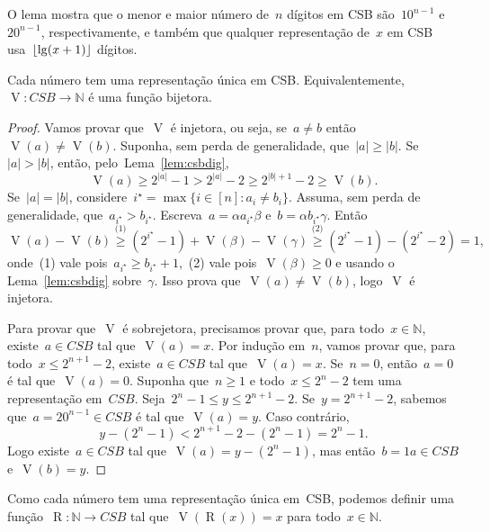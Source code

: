 \documentclass[main.tex]{subfiles}
\newcommand{\CSB}{\textit{CSB}}
\renewcommand{\V}{\operatorname{V}}
\newcommand{\R}{\operatorname{R}}
\begin{document}
O lema mostra que o menor e maior número de~$n$ dígitos em CSB são~$10^{n-1}$ e~$20^{n-1}$, respectivamente, e também que qualquer representação de~$x$ em CSB usa~$\lfloor\lg(x + 1)\rfloor$ dígitos.

\begin{theorem} \label{thm:csbbij}
	Cada número tem uma representação única em CSB. Equivalentemente,~${\V: \CSB \rightarrow \mathbb{N}}$ é uma função bijetora.
\end{theorem}
\begin{proof}
	Vamos provar que~$\V$ é injetora, ou seja, se~${a \neq b}$ então~${\V(a) \neq \V(b)}$. Suponha, sem perda de generalidade, que~$|a| \geq |b|$. Se~$|a| > |b|$, então, pelo~Lema~\ref{lem:csbdig},
	$$ \V(a) \geq 2^{|a|} - 1 > 2^{|a|} - 2 \geq 2^{|b| + 1} - 2 \geq \V(b). $$
	Se~$|a| = |b|$, considere~${i^\star = \max\{i \in [n] : a_i \neq b_i\}}$. Assuma, sem perda de generalidade, que~${a_{i^\star} > b_{i^\star}}$. Escreva~${a = \alpha a_{i^\star} \beta}$ e~${b = \alpha b_{i^\star} \gamma}$. Então
	$$ \V(a) - \V(b) \stackrel{\text{(1)}}{\geq} (2^{i^\star} - 1) + \V(\beta) - \V(\gamma) \stackrel{\text{(2)}}{\geq} (2^{i^\star} - 1) - (2^{i^\star} - 2) = 1, $$
	onde~(1) vale pois~$a_{i^\star} \geq b_{i^\star} + 1$,~(2) vale pois~$\V(\beta) \geq 0$ e usando o Lema~\ref{lem:csbdig} sobre~$\gamma$. Isso prova que~$\V(a) \neq \V(b)$, logo~$\V$ é injetora.

	Para provar que~$\V$ é sobrejetora, precisamos provar que, para todo~$x \in \mathbb{N}$, existe~$a \in \CSB$ tal que~$\V(a) = x$. Por indução em~$n$, vamos provar que, para todo~$x \leq 2^{n+1} - 2$, existe~$a \in \CSB$ tal que~$\V(a) = x$. Se~$n = 0$, então~$a = 0$ é tal que~$\V(a) = 0$. Suponha que~$n \geq 1$ e todo~${x \leq 2^n - 2}$ tem uma representação em~$\CSB$. Seja~${2^n - 1 \leq y \leq 2^{n+1} - 2}$. Se~$y = 2^{n+1} - 2$, sabemos que~${a = 20^{n-1} \in \CSB}$ é tal que~$\V(a) = y$. Caso contrário,~
	$$y - (2^n - 1) < 2^{n+1} - 2 - (2^n - 1) = 2^n - 1.$$
	Logo existe~$a \in \CSB$ tal que~${\V(a) = y - (2^n - 1)}$, mas então~$b = 1a \in \CSB$ e~$\V(b) = y$.
\end{proof}

Como cada número tem uma representação única em~CSB, podemos definir uma função~${\R: \mathbb{N} \rightarrow \CSB}$ tal que~$\V(\R(x)) = x$ para todo~$x \in \mathbb{N}$.
\end{document}
